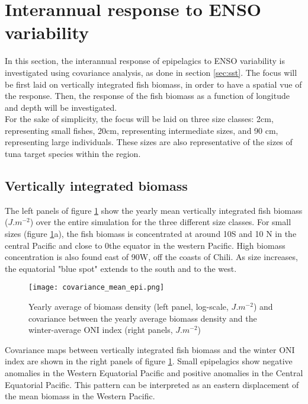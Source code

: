 \section{Interannual response to ENSO variability}

In this section, the interannual response of epipelagics to ENSO variability is investigated using covariance analysis, as done in section \ref{sec:sst}. 
The focus will be first laid on vertically integrated 
fish biomass, in order to have a spatial vue of the response. Then, the response of the fish biomass as a function of longitude and depth will be investigated.\\

For the sake of simplicity, the focus will be laid on three size classes: 2cm, representing small fishes, 20cm, representing intermediate sizes, and 90 cm, representing large individuals. These sizes are also
representative of the sizes of tuna target species within the region.\\

\subsection{Vertically integrated biomass}

The left panels of figure \ref{fig:mean-cov-ape} show the yearly mean vertically integrated fish biomass ($J.m^{-2}$) over the entire simulation for the three different size classes. For small sizes (figure \ref{fig:mean-cov-ape}a), the fish biomass is concentrated at around 10\degree S and 10 \degree N in the central Pacific and close to 0the equator in the western Pacific. High biomass concentration is also found east of 90\degree W, off the coasts of Chili. As size increases, the equatorial "blue spot" extends to the south and to the west. \\

\begin{figure}[h!]
    \centering
    \texttt{[image: covariance\_mean\_epi.png]}
    \caption{Yearly average of biomass density (left panel, log-scale, $J.m^{-2}$) and 
    covariance between the yearly average biomass density and the winter-average ONI index (right panels, $J.m^{-2}$)}
    \label{fig:mean-cov-ape}
\end{figure}

Covariance maps between vertically integrated fish biomass and the winter ONI index are shown in the right panels of figure \ref{fig:mean-cov-ape}. 
Small epipelagics show negative anomalies in the Western Equatorial Pacific and positive anomalies in the Central Equatorial Pacific. This pattern can be interpreted as an eastern displacement of the mean biomass in the Western Pacific.\\

